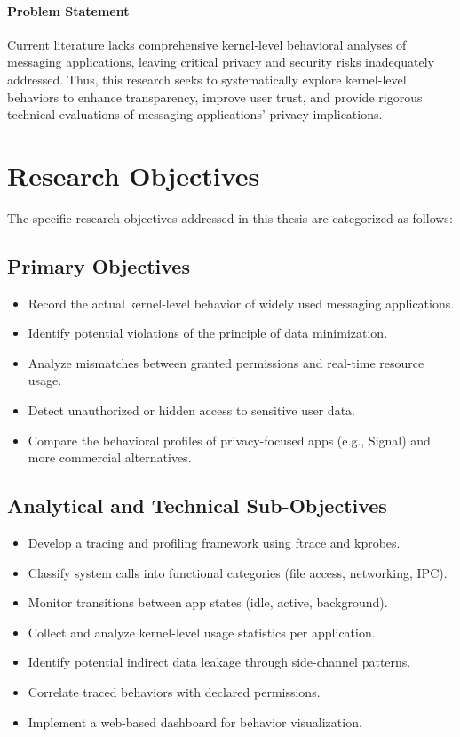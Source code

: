 \documentclass[a4paper,12pt]{report}
\begin{document}
\paragraph{Problem Statement}
Current literature lacks comprehensive kernel-level behavioral analyses of messaging applications, leaving critical privacy and security risks inadequately addressed. Thus, this research seeks to systematically explore kernel-level behaviors to enhance transparency, improve user trust, and provide rigorous technical evaluations of messaging applications' privacy implications.

\section{Research Objectives}
The specific research objectives addressed in this thesis are categorized as follows:

\subsection*{Primary Objectives}
\begin{itemize}
\item Record the actual kernel-level behavior of widely used messaging applications.
\item Identify potential violations of the principle of data minimization.
\item Analyze mismatches between granted permissions and real-time resource usage.
\item Detect unauthorized or hidden access to sensitive user data.
\item Compare the behavioral profiles of privacy-focused apps (e.g., Signal) and more commercial alternatives.
\end{itemize}

\subsection*{Analytical and Technical Sub-Objectives}
\begin{itemize}
\item Develop a tracing and profiling framework using ftrace and kprobes.
\item Classify system calls into functional categories (file access, networking, IPC).
\item Monitor transitions between app states (idle, active, background).
\item Collect and analyze kernel-level usage statistics per application.
\item Identify potential indirect data leakage through side-channel patterns.
\item Correlate traced behaviors with declared permissions.
\item Implement a web-based dashboard for behavior visualization.
\end{itemize}
\end{document}
